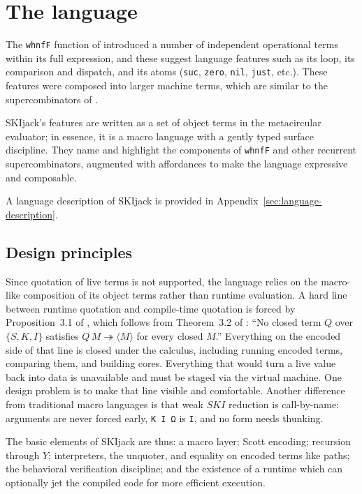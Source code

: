 \documentclass[english,submission,code=tt]{programming}
\begin{document}
\section{The language}\label{sec:language}

The \texttt{whnfF} function of \citet{Davis2027} introduced a number of
independent operational terms within its full expression, and these
suggest language features such as its loop, its comparison and dispatch,
and its atoms (\texttt{suc}, \texttt{zero}, \texttt{nil}, \texttt{just},
etc.).  These features were composed into larger machine terms, which
are similar to the supercombinators of \citet{Hughes1982}.

SKIjack's features are written as a set of object terms in the 
metacircular evaluator; in essence, it is a macro language with a gently 
typed surface discipline.  They name and highlight the components of
\texttt{whnfF} and other recurrent supercombinators, augmented with
affordances to make the language expressive and composable.

A language description of SKIjack is provided in Appendix~\ref{sec:language-description}.

\subsection{Design principles}\label{sec:design-principles}

Since quotation of live terms is not supported, the language relies on 
the macro-like composition of its object terms rather than runtime 
evaluation.  A hard line between runtime quotation and compile-time
quotation is forced by Proposition~3.1 of \citet{Davis2027}, which follows from Theorem~3.2 of \citet{JayGivenWilson2011}:  ``No closed term $Q$ over $\{S,K,I\}$ satisfies $Q\,M \twoheadrightarrow \langle M\rangle$ for every closed $M$.''  Everything on the encoded side of 
that line is closed under the calculus, including running encoded terms, 
comparing them, and building cores.  Everything that would turn a live 
value back into data is unavailable and must be staged via the virtual
machine.  One design problem is to make that line visible and 
comfortable.  Another difference from traditional macro languages is 
that weak $SKI$ reduction is call-by-name: arguments are never forced 
early, \texttt{K I Ω} is \texttt{I}, and no form needs thunking.

The basic elements of SKIjack are thus:  a macro layer; Scott 
encoding; recursion through $Y$; interpreters, the unquoter, and 
equality on encoded terms like paths; the behavioral verification 
discipline; and the existence of a runtime which can optionally jet the 
compiled code for more efficient execution.
\end{document}
